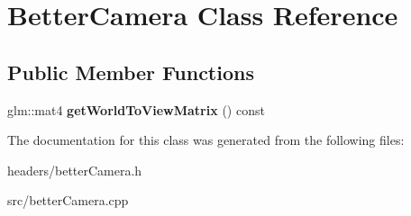 \hypertarget{class_better_camera}{\section{Better\+Camera Class Reference}
\label{class_better_camera}
}
\subsection*{Public Member Functions}
\begin{DoxyCompactItemize}
\item 
\hypertarget{class_better_camera_a9b68a85c6c8bbe1062a2b77cece3b5ab}{glm\+::mat4 {\bfseries get\+World\+To\+View\+Matrix} () const }\label{class_better_camera_a9b68a85c6c8bbe1062a2b77cece3b5ab}

\end{DoxyCompactItemize}


The documentation for this class was generated from the following files\+:\begin{DoxyCompactItemize}
\item 
headers/better\+Camera.\+h\item 
src/better\+Camera.\+cpp\end{DoxyCompactItemize}
